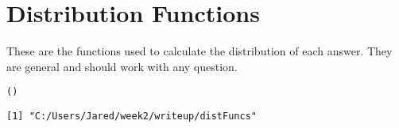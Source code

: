 \documentclass{article}
\title{\myTitle}
\author{Richard Garfield\\ Columbia University School of Nursing \and Jared P. Lander\\ JP Lander Consulting}
\begin{document}






\section{Distribution Functions}
\label{sec:DistributionFunctions}
These are the functions used to calculate the distribution of each answer. They are general and should work with any question.

\begin{knitrout}
\color{fgcolor}\begin{kframe}
\begin{alltt}
()
\end{alltt}
\begin{verbatim}
[1] "C:/Users/Jared/week2/writeup/distFuncs"
\end{verbatim}
\end{kframe}
\end{knitrout}
\end{document}
